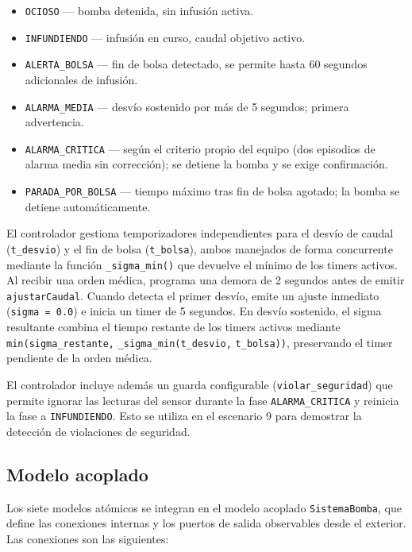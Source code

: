 \documentclass[12pt,a4paper]{article}
\begin{document}
\begin{itemize}
    \item \texttt{OCIOSO} --- bomba detenida, sin infusión activa.
    \item \texttt{INFUNDIENDO} --- infusión en curso, caudal objetivo
          activo.
    \item \texttt{ALERTA\_BOLSA} --- fin de bolsa detectado, se permite
          hasta 60 segundos adicionales de infusión.
    \item \texttt{ALARMA\_MEDIA} --- desvío sostenido por más de 5
          segundos; primera advertencia.
    \item \texttt{ALARMA\_CRITICA} --- según el criterio propio del
          equipo (dos episodios de alarma media sin corrección); se
          detiene la bomba y se exige confirmación.
    \item \texttt{PARADA\_POR\_BOLSA} --- tiempo máximo tras fin de bolsa
          agotado; la bomba se detiene automáticamente.
\end{itemize}

El controlador gestiona temporizadores independientes para el desvío
de caudal (\texttt{t\_desvio}) y el fin de bolsa (\texttt{t\_bolsa}),
ambos manejados de forma concurrente mediante la función
\texttt{\_sigma\_min()} que devuelve el mínimo de los timers
activos.  Al recibir una orden médica, programa una demora de 2
segundos antes de emitir \texttt{ajustarCaudal}.  Cuando detecta el
primer desvío, emite un ajuste inmediato (\texttt{sigma = 0.0}) e
inicia un timer de 5 segundos.  En desvío sostenido, el sigma
resultante combina el tiempo restante de los timers activos mediante
\texttt{min(sigma\_restante,}\relax
\texttt{\_sigma\_min(t\_desvio,}\relax
\texttt{t\_bolsa))},
preservando el timer pendiente de la orden médica.

El controlador incluye además un guarda configurable
(\texttt{violar\_seguridad}) que permite ignorar las lecturas del
sensor durante la fase \texttt{ALARMA\_CRITICA} y reinicia la fase a
\texttt{INFUNDIENDO}.
Esto se utiliza en el escenario 9 para demostrar la detección de
violaciones de seguridad.

\subsection{Modelo acoplado}

Los siete modelos atómicos se integran en el modelo acoplado
\texttt{SistemaBomba}, que define las conexiones internas y los puertos
de salida observables desde el exterior.  Las conexiones son las
siguientes:
\end{document}
